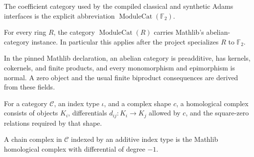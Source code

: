 \begin{definition}
  \label{def:core-f2-module-category}
  \leanok
  The coefficient category used by the compiled classical and synthetic Adams
  interfaces is the explicit abbreviation
  $\operatorname{ModuleCat}(\mathbb F_2)$.
\end{definition}

\begin{theorem}
  \label{thm:mathlib-module-category-abelian}
  \mathlibok
  For every ring $R$, the category $\operatorname{ModuleCat}(R)$ carries
  Mathlib's abelian-category instance.  In particular this applies after the
  project specializes $R$ to $\mathbb F_2$.
\end{theorem}

\begin{definition}
  \label{def:mathlib-abelian}
  \mathlibok
  In the pinned Mathlib declaration, an abelian category is preadditive, has
  kernels, cokernels, and finite products, and every monomorphism and
  epimorphism is normal.  A zero object and the usual finite biproduct
  consequences are derived from these fields.
\end{definition}

\begin{definition}
  \label{def:mathlib-homological-complex}
  \mathlibok
  For a category $\mathcal C$, an index type $\iota$, and a complex shape
  $c$, a homological complex consists of objects $K_i$, differentials
  $d_{ij}:K_i\to K_j$ allowed by $c$, and the square-zero relations required
  by that shape.
\end{definition}

\begin{definition}
  \label{def:mathlib-chain-complex}
  \mathlibok
  A chain complex in $\mathcal C$ indexed by an additive index type is the
  Mathlib homological complex with differential of degree $-1$.
\end{definition}


